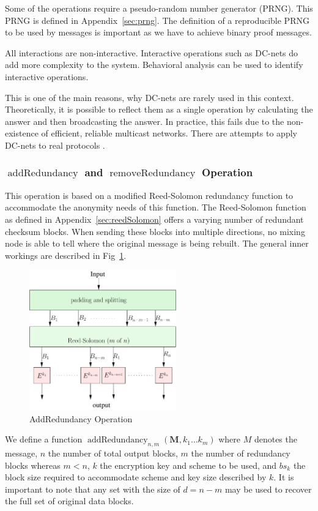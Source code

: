 \documentclass[runningheads]{llncs}
\DeclareMathOperator{\addRedundancy}{addRedundancy}
\DeclareMathOperator{\removeRedundancy}{removeRedundancy}
\begin{document}
Some of the operations require a pseudo-random number generator (PRNG). This PRNG is defined in Appendix~\ref{sec:prng}. The definition of a reproducible PRNG to be used by messages is important as we have to achieve binary proof messages.

All interactions are non-interactive. Interactive operations such as DC-nets do add more complexity to the system. Behavioral analysis can be used to identify interactive operations. 

This is one of the main reasons, why DC-nets are rarely used in this context. Theoretically, it is possible to reflect them as a single operation by calculating the answer and then broadcasting the answer. In practice, this fails due to the non-existence of efficient, reliable multicast networks. There are attempts to apply DC-nets to real protocols \cite{Corrigan-Gibbs:2010:DAA:1866307.1866346}.

\subsubsection{$\addRedundancy$ and $\removeRedundancy$ Operation}
This operation is based on a modified Reed-Solomon redundancy function to accommodate the anonymity needs of this function. The Reed-Solomon function as defined in Appendix~\ref{sec:reedSolomon} offers a varying number of redundant checksum blocks. When sending these blocks into multiple directions, no mixing node is able to tell where the original message is being rebuilt. The general inner workings are described in Fig~\ref{fig:addRedundancy}.

\begin{figure}[htb]
	\centering
	\includegraphics[width=2.5in]{../../inc/addRedundancyOp}
	\caption{AddRedundancy Operation}
	\label{fig:addRedundancy}
\end{figure}

We define a function $\addRedundancy_{n,m}( \mathbf{M},k_1\ldots k_{m} )$ where $M$ denotes the message, $n$ the number of total output blocks, $m$ the number of redundancy blocks whereas $m<n$, $k$ the encryption key and scheme to be used, and $bs_k$ the block size required to accommodate scheme and key size described by $k$. It is important to note that any set with the size of $d=n-m$ may be used to recover the full set of original data blocks.
\end{document}
